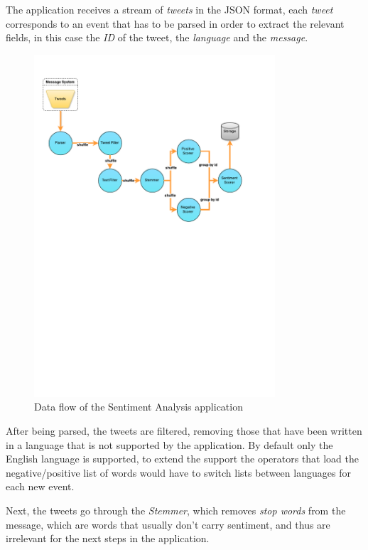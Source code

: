 \documentclass[ppgc,diss,english]{iiufrgs}
\begin{document}
The application receives a stream of \emph{tweets} in the JSON format, each \emph{tweet} corresponds to an event that has to be parsed in order to extract the relevant fields, in this case the \emph{ID} of the tweet, the \emph{language} and the \emph{message}.

\begin{figure}[!ht]
	\centering
	\includegraphics[width=0.8\textwidth]{images/apps/TwitterSentiment2.pdf}
	\caption{Data flow of the Sentiment Analysis application}
	\label{fig:app_sentiment_analysis}
\end{figure}

After being parsed, the tweets are filtered, removing those that have been written in a language that is not supported by the application. By default only the English language is supported, to extend the support the operators that load the negative/positive list of words would have to switch lists between languages for each new event.

Next, the tweets go through the \emph{Stemmer}, which removes \emph{stop words} from the message, which are words that usually don't carry sentiment, and thus are irrelevant for the next steps in the application.
\end{document}
